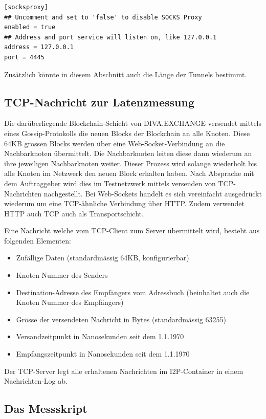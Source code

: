 \begin{lstlisting}
[socksproxy]
## Uncomment and set to 'false' to disable SOCKS Proxy
enabled = true
## Address and port service will listen on, like 127.0.0.1
address = 127.0.0.1
port = 4445
\end{lstlisting}

Zusätzlich könnte in diesem Abschnitt auch die Länge der Tunnels bestimmt.

\subsection{TCP-Nachricht zur Latenzmessung}\label{sec:nachricht_latenzmessung}

Die darüberliegende Blockchain-Schicht von DIVA.EXCHANGE versendet mittels eines Gossip-Protokolls die neuen Blocks der Blockchain an alle Knoten.
Diese 64KB grossen Blocks werden über eine Web-Socket-Verbindung an die Nachbarknoten übermittelt.
Die Nachbarknoten leiten diese dann wiederum an ihre jeweiligen Nachbarknoten weiter.
Dieser Prozess wird solange wiederholt bis alle Knoten im Netzwerk den neuen Block erhalten haben.
Nach Absprache mit dem Auftraggeber wird dies im Testnetzwerk mittels versenden von TCP-Nachrichten nachgestellt.
Bei Web-Sockets handelt es sich vereinfacht ausgedrückt wiederum um eine TCP-ähnliche Verbindung über HTTP. Zudem verwendet HTTP auch TCP auch als Transportschicht.

Eine Nachricht welche vom TCP-Client zum Server übermittelt wird, besteht aus folgenden Elementen:

\begin{itemize}
    \item Zufällige Daten (standardmässig 64KB, konfigurierbar)
    \item Knoten Nummer des Senders
    \item Destination-Adresse des Empfängers vom Adressbuch (beinhaltet auch die Knoten Nummer des Empfängers)
    \item Grösse der versendeten Nachricht in Bytes (standardmässig 63255)
    \item Versandzeitpunkt in Nanosekunden seit dem 1.1.1970
    \item Empfangszeitpunkt in Nanosekunden seit dem 1.1.1970
\end{itemize}

Der TCP-Server legt alle erhaltenen Nachrichten im I2P-Container in einem Nachrichten-Log ab.

\subsection{Das Messskript}\label{sec:messskript}

